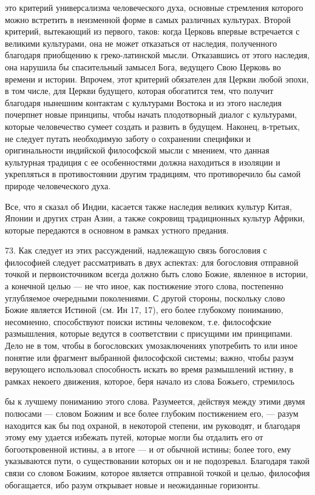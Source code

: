\documentclass[a5paper,10pt]{article}
\begin{document}
это критерий универсализма человеческого духа, основные стремления которого
можно встретить в неизменной форме в самых различных культурах. Второй
критерий, вытекающий из первого, таков: когда Церковь впервые встречается с
великими культурами, она не может отказаться от наследия, полученного благодаря
приобщению к греко-латинской мысли. Отказавшись от этого наследия, она нарушила
бы спасительный замысел Бога, ведущего Свою Церковь во времени и истории.
Впрочем, этот критерий обязателен для Церкви любой эпохи, в том числе, для
Церкви будущего, которая обогатится тем, что получит благодаря нынешним
контактам с культурами Востока и из этого наследия почерпнет новые принципы,
чтобы начать плодотворный диалог с культурами, которые человечество сумеет
создать и развить в будущем. Наконец, в-третьих, не следует путать необходимую
заботу о сохранении специфики и оригинальности индийской философской мысли с
мнением, что данная культурная традиция с ее особенностями должна находиться в
изоляции и укрепляться в противостоянии другим традициям, что противоречило бы
самой природе человеческого духа.

Все, что я сказал об Индии, касается также наследия великих культур Китая,
Японии и других стран Азии, а также сокровищ традиционных культур Африки,
которые передаются в основном в рамках устного предания.

73. Как следует из этих рассуждений, надлежащую связь богословия с философией
следует рассматривать в двух аспектах: для богословия отправной точкой и
первоисточником всегда должно быть слово Божие, явленное в истории, а конечной
целью — не что иное, как постижение этого слова, постепенно углубляемое
очередными поколениями. С другой стороны, поскольку слово Божие является
Истиной (см. Ин 17, 17), его более глубокому пониманию, несомненно,
способствуют поиски истины человеком, т.е. философские размышления, которые
ведутся в соответствии с присущими им принципами. Дело не в том, чтобы в
богословских умозаключениях употребить то или иное понятие или фрагмент
выбранной философской системы; важно, чтобы разум верующего использовал
способность искать во время размышлений истину, в рамках некоего движения,
которое, беря начало из слова Божьего, стремилось

бы к лучшему пониманию этого слова. Разумеется, действуя между этими двумя
полюсами — словом Божиим и все более глубоким постижением его, — разум
находится как бы под охраной, в некоторой степени, им руководят, и благодаря
этому ему удается избежать путей, которые могли бы отдалить его от
богооткровенной истины, а в итоге — и от обычной истины; более того, ему
указываются пути, о существовании которых он и не подозревал. Благодаря такой
связи со словом Божиим, которое является отправной точкой и целью, философия
обогащается, ибо разум открывает новые и неожиданные горизонты.
\end{document}
